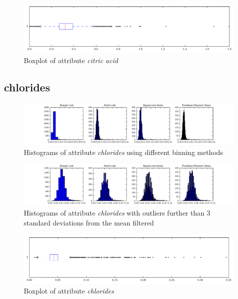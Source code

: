 \documentclass{report}
\begin{document}
\begin{figure}[H]
\includegraphics[width=\textwidth]{boxplots/citric_acid.pdf}
\caption{Boxplot of attribute \emph{citric acid}}\end{figure}

\newpage\subsection{chlorides}
\begin{figure}[H]
\includegraphics[width=\textwidth]{histograms/chlorides.pdf}
\caption{Histograms of attribute \emph{chlorides} using different binning methods}\end{figure}

\begin{figure}[H]
\includegraphics[width=\textwidth]{histograms/chlorides_filtered.pdf}
\caption{Histograms of attribute \emph{chlorides} with outliers further than 3 standard deviations from the mean filtered}\n\end{figure}

\begin{figure}[H]
\includegraphics[width=\textwidth]{boxplots/chlorides.pdf}
\caption{Boxplot of attribute \emph{chlorides}}\end{figure}
\end{document}

